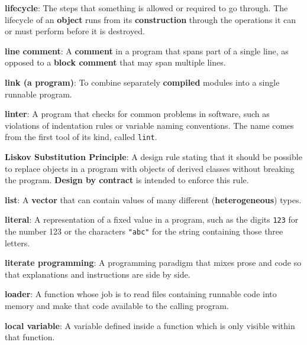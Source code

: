 \documentclass[krantzl]{krantz}
\newcommand{\glosskey}[1]{\textbf{#1}}
\begin{document}
\noindent \textbf{{\newline}\glosskey{lifecycle}}: 
The steps that something is allowed or required to go through. The lifecycle of an \glosskey{object} runs from its \glosskey{construction} through the operations it can or must perform before it is destroyed.


\noindent \textbf{{\newline}\glosskey{line comment}}: 
A \glosskey{comment} in a program that spans part of a single line, as opposed to a \glosskey{block comment} that may span multiple lines.


\noindent \textbf{{\newline}\glosskey{link (a program)}}: 
To combine separately \glosskey{compiled} modules into a single runnable program.


\noindent \textbf{{\newline}\glosskey{linter}}: 
A program that checks for common problems in software, such as violations of indentation rules or variable naming conventions. The name comes from the first tool of its kind, called \texttt{lint}.


\noindent \textbf{{\newline}\glosskey{Liskov Substitution Principle}}: 
A design rule stating that it should be possible to replace objects in a program with objects of derived classes without breaking the program. \glosskey{Design by contract} is intended to enforce this rule.


\noindent \textbf{{\newline}\glosskey{list}}: 
A \glosskey{vector} that can contain values of many different (\glosskey{heterogeneous}) types.


\noindent \textbf{{\newline}\glosskey{literal}}: 
A representation of a fixed value in a program, such as the digits \texttt{123} for the number 123 or the characters \texttt{"abc"} for the string containing those three letters.


\noindent \textbf{{\newline}\glosskey{literate programming}}: 
A programming paradigm that mixes prose and code so that explanations and instructions are side by side.


\noindent \textbf{{\newline}\glosskey{loader}}: 
A function whose job is to read files containing runnable code into memory and make that code available to the calling program.


\noindent \textbf{{\newline}\glosskey{local variable}}: 
A variable defined inside a function which is only visible within that function.
\end{document}
